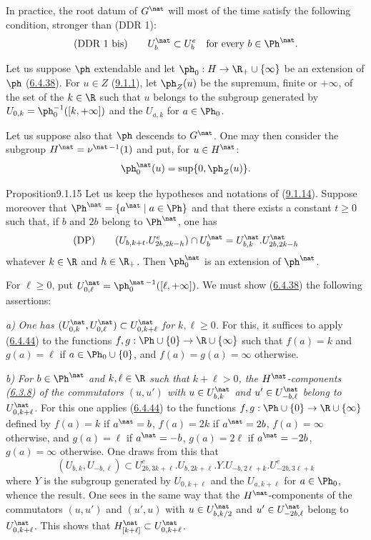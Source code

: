 \documentclass[12pt,a4paper,oneside,english]{smfart}
\makeatletter
\newcommand{\btanchor}[1]{\leavevmode\Hy@raisedlink{\hypertarget{bt:#1}{}}}
\newcommand{\btpageanchor}[1]{\Hy@raisedlink{\hypertarget{p:#1}{}}}
\newcommand{\btref}[1]{\hyperlink{bt:#1}{#1}}
\newcommand{\btpage}[1]{\marginnote{p.~#1}\btpageanchor{#1}}
\newcommand{\pg}[1]{\btpage{#1}}
\theoremstyle{definition}
\theoremstyle{bt}
\makeatother
\begin{document}
In practice, the root datum of $G^\nat$ will most of the time satisfy the following
condition, stronger than (DDR 1):
\[
\text{\upshape(DDR 1 bis)}\qquad U^\nat_b\subset U^e_b\quad\text{for every }
b\in\Ph^\nat .
\]

\btanchor{9.1.14}
Let us suppose $\ph$ extendable and let $\ph_0:H\to\R_+\cup\{\infty\}$ be an extension
of $\ph$ (\btref{6.4.38}). For $u\in Z$ (\btref{9.1.1}), let $\ph_Z(u)$ be the supremum, finite or
$+\infty$, of the set of the $k\in\R$ such that $u$ belongs to the subgroup generated by
$U_{0,k}=\ph_0^{-1}([k,+\infty])$ and the $U_{a,k}$ for $a\in\Ph_0$.

Let us suppose also that $\ph$ descends to $G^\nat$. One may then consider the subgroup
$H^\nat=\nu^{\nat\,-1}(1)$ and put, for $u\in H^\nat$:
\[
\ph^\nat_0(u)=\sup\{0,\ph_Z(u)\}.
\]

\begin{stmt}{Proposition}{9.1.15}\btanchor{9.1.15}
Let us keep the hypotheses and notations of (\btref{9.1.14}). Suppose moreover that
$\Ph^\nat=\{a^\nat\mid a\in\Ph\}$ and that there exists a constant $t\geqslant0$ such
that, if $b$ and $2b$ belong to $\Ph^\nat$, one has
\[
\text{\upshape(DP)}\qquad
(U_{b,k+t}.U^e_{2b,2k-h})\cap U^\nat_b=U^\nat_{b,k}.U^\nat_{2b,2k-h}
\]
whatever $k\in\R$ and $h\in\R_+$. Then $\ph^\nat_0$ is an extension of $\ph^\nat$.
\end{stmt}

For $\ell\geqslant0$, put $U^\nat_{0,\ell}=\ph^{\nat\,-1}_0([\ell,+\infty])$. We must
show (\btref{6.4.38}) the following assertions:

\medskip
\noindent
\textit{a)} \emph{One has $(U^\nat_{0,k},U^\nat_{0,\ell})\subset U^\nat_{0,k+\ell}$ for
$k,\ell\geqslant0$.} For this, it suffices to apply (\btref{6.4.44}) to the functions
$f,g:\Ph\cup\{0\}\to\R\cup\{\infty\}$ such that $f(a)=k$ and $g(a)=\ell$ if
$a\in\Ph_0\cup\{0\}$, and $f(a)=g(a)=\infty$ otherwise.

\medskip
\noindent
\textit{b)} \emph{For $b\in\Ph^\nat$ and $k,\ell\in\R$ such that $k+\ell>0$, the
$H^\nat$-components (\btref{6.3.8}) of the commutators $(u,u')$ with $u\in U^\nat_{b,k}$ and
$u'\in U^\nat_{-b,\ell}$ belong to $U^\nat_{0,k+\ell}$.} For this one applies (\btref{6.4.44})
to the functions $f,g:\Ph\cup\{0\}\to\R\cup\{\infty\}$ defined by $f(a)=k$ if
$a^\nat=b$, $f(a)=2k$ if $a^\nat=2b$, $f(a)=\infty$ otherwise, and $g(a)=\ell$ if
$a^\nat=-b$, $g(a)=2\ell$ if $a^\nat=-2b$, $g(a)=\infty$ otherwise. One draws from this
that
\[
(U_{b,k},U_{-b,\ell})\subset U^e_{2b,3k+\ell}.U_{b,2k+\ell}.Y.U_{-b,2\ell+k}. U^e_{-2b,3\ell+k}
\]
\pg{201}
where $Y$ is the subgroup generated by $U_{0,k+\ell}$ and the $U_{a,k+\ell}$ for
$a\in\Ph_0$, whence the result. One sees in the same way that the $H^\nat$-components of
the commutators $(u,u')$ and $(u',u)$ with $u\in U^\nat_{b,k/2}$ and
$u'\in U^\nat_{-2b,\ell}$ belong to $U^\nat_{0,k+\ell}$. This shows that
$H^\nat_{[k+\ell]}\subset U^\nat_{0,k+\ell}$.
\end{document}
